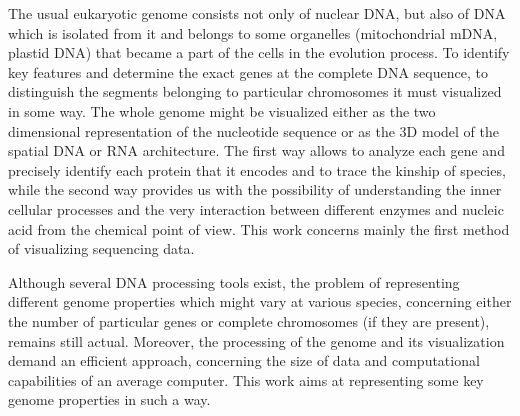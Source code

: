The usual eukaryotic genome consists not only of nuclear DNA, but also of DNA which is isolated from it and belongs to some organelles 
(mitochondrial mDNA, plastid DNA) that became a part of the cells in the evolution process. To identify key features and determine the exact genes at 
the complete DNA sequence, to distinguish the segments belonging to particular chromosomes it must visualized in some way. The whole genome might be 
visualized either as the two dimensional representation of the nucleotide sequence or as the 3D model of the spatial DNA or RNA architecture. The first 
way allows to analyze each gene and precisely identify each protein that it encodes and to trace the kinship of species, while the second 
way provides us with the possibility of understanding the inner cellular processes and the very interaction between different enzymes 
and nucleic acid from the chemical point of view. This work concerns mainly the first method of visualizing sequencing data. 

Although several DNA processing tools exist, the problem of representing different genome properties which might vary at various species, 
concerning either the number of particular genes or complete chromosomes (if they are present), remains still actual. Moreover, 
the processing of the genome and its visualization demand an efficient approach, concerning the size of data and computational capabilities 
of an average computer. This work aims at representing some key genome properties in such a way.
